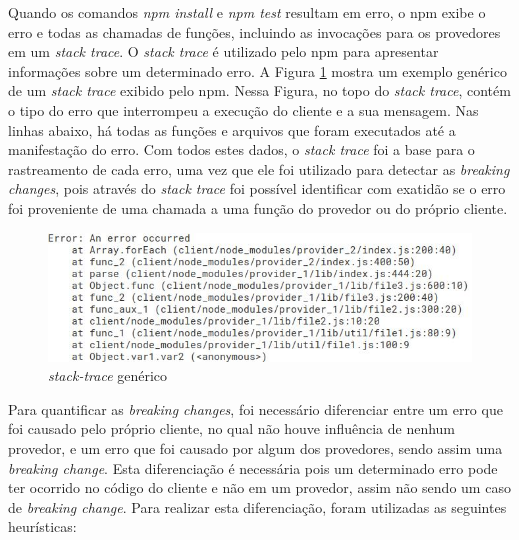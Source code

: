 Quando os comandos \textit{npm install} e \textit{npm test} resultam em erro, o \gls{npm} exibe o erro e todas as chamadas de funções, incluindo as invocações para os provedores em um \textit{stack trace}. O \textit{stack trace} é utilizado pelo \gls{npm} para apresentar informações sobre um determinado erro. A Figura \ref{fig:trace} mostra um exemplo genérico de um \textit{stack trace} exibido pelo \gls{npm}. Nessa Figura, no topo do \textit{stack trace}, contém o tipo do erro que interrompeu a execução do cliente e a sua mensagem. Nas linhas abaixo, há todas as funções e arquivos que foram executados até a manifestação do erro. Com todos estes dados, o \textit{stack trace} foi a base para o rastreamento de cada erro, uma vez que ele foi utilizado para detectar as \textit{breaking changes}, pois através do \textit{stack trace} foi possível identificar com exatidão se o erro foi proveniente de uma chamada a uma função do provedor ou do próprio cliente.

\begin{figure}
    \centering
    \includegraphics[scale=0.7]{figuras/stack_trace.jpeg}
    \caption{\textit{stack-trace} genérico}
    \label{fig:trace}
\end{figure}{}

Para quantificar as \textit{breaking changes}, foi necessário diferenciar entre um erro que foi causado pelo próprio cliente, no qual não houve influência de nenhum provedor, e um erro que foi causado por algum dos provedores, sendo assim uma \textit{breaking change}. Esta diferenciação é necessária pois um determinado erro pode ter ocorrido no código do cliente e não em um provedor, assim não sendo um caso de \textit{breaking change}. Para realizar esta diferenciação, foram utilizadas as seguintes heurísticas:

